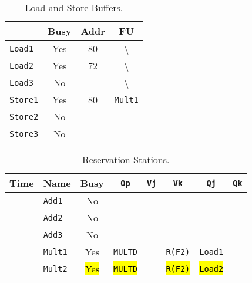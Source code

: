 \begin{enumerate}
    \begin{table}[!htp]
        \centering
        \begin{tabular}{@{} l | c c c @{}}
            \toprule
                                & Busy      & Addr      & FU   \\
            \midrule
            \texttt{Load1}      & Yes       & 80        & \textbackslash        \\ [.3em]
            \texttt{Load2}      & Yes       & 72        & \textbackslash        \\ [.3em]
            \texttt{Load3}      & No        &           & \textbackslash        \\
            \cmidrule{1-4}
            \texttt{Store1}     & Yes       & 80        & \texttt{Mult1}        \\ [.3em]
            \texttt{Store2}     & No        &           &                       \\ [.3em]
            \texttt{Store3}     & No        &           &                       \\
            \bottomrule
        \end{tabular}
        \caption*{Load and Store Buffers.}
    \end{table}

    \begin{table}[!htp]
        \centering
        \begin{tabular}{@{} l l | c c c c c c @{}}
            \toprule
            Time        & Name              & Busy      & \texttt{Op}           & \texttt{Vj}       & \texttt{Vk}           & \texttt{Qj}           & \texttt{Qk}       \\
            \midrule
                        & \texttt{Add1}     & No        &                       &                   &                       &                       &                   \\ [.3em]
                        & \texttt{Add2}     & No        &                       &                   &                       &                       &                   \\ [.3em]
                        & \texttt{Add3}     & No        &                       &                   &                       &                       &                   \\ [.3em]
                        & \texttt{Mult1}    & Yes       & \texttt{MULTD}        &                   & \texttt{R(F2)}        & \texttt{Load1}        &                   \\ [.3em]
                        & \texttt{Mult2}    & \hl{Yes}  & \hl{\texttt{MULTD}}   &                   & \hl{\texttt{R(F2)}}   & \hl{\texttt{Load2}}   &                   \\
            \bottomrule
        \end{tabular}
        \caption*{Reservation Stations.}
    \end{table}


\end{enumerate}
